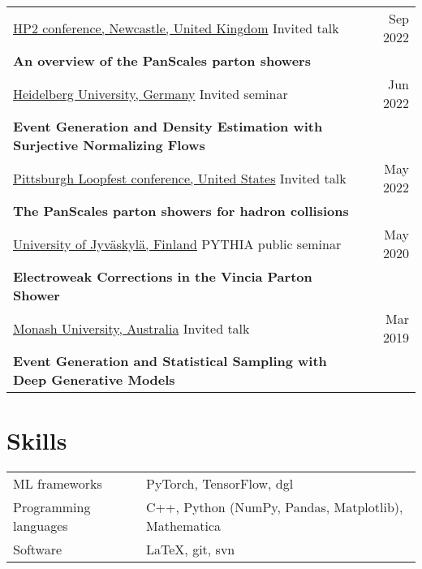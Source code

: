 \documentclass[a4paper,12pt]{article}
\begin{document}
\begin{tabularx}{\linewidth}{ @{}l r@{} }
\underline{HP2 conference, Newcastle, United Kingdom} Invited talk & \hfil  Sep 2022 \\[1.75pt]
\textbf{An overview of the PanScales parton showers} & \\[3.5pt]

\underline{Heidelberg University, Germany} Invited seminar & \hfill Jun 2022 \\[1.75pt]
\textbf{Event Generation and Density Estimation with Surjective Normalizing Flows} & \\[3.5pt]

\underline{Pittsburgh Loopfest conference, United States} Invited talk & \hfill May 2022 \\[1.75pt]
\textbf{The PanScales parton showers for hadron collisions} & \\[3.5pt]

\underline{University of Jyväskylä, Finland} PYTHIA public seminar & \hfill May 2020 \\[1.75pt]
\textbf{Electroweak Corrections in the Vincia Parton Shower} & \\[3.5pt]

\underline{Monash University, Australia} Invited talk & \hfill Mar 2019 \\[1.75pt]
\textbf{Event Generation and Statistical Sampling with Deep Generative Models} &
\end{tabularx}





\section{Skills}
\begin{tabularx}{\linewidth}{@{}l X@{}}
ML frameworks & \normalsize{PyTorch, TensorFlow, dgl} \\
Programming languages & \normalsize{C++, Python (NumPy, Pandas, Matplotlib), Mathematica} \\
Software & \normalsize{LaTeX, git, svn}  \\
\end{tabularx}

\vfill
{}
\end{document}
